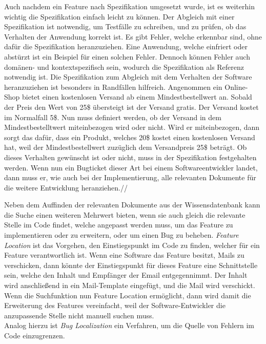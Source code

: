 Auch nachdem ein Feature nach Spezifikation umgesetzt wurde, ist es weiterhin wichtig die Spezifikation einfach leicht zu können.
Der Abgleich mit einer Spezifikation ist notwendig, um Testfälle zu schreiben, und zu prüfen, ob das Verhalten der Anwendung korrekt ist.
Es gibt Fehler, welche erkennbar sind, ohne dafür die Spezifikation heranzuziehen.
Eine Anwendung, welche einfriert oder abstürzt ist ein Beispiel für einen solchen Fehler.
Dennoch können Fehler auch domänen- und kontextspezifisch sein, wodurch die Spezifikation als Referenz notwendig ist.
Die Spezifikation zum Abgleich mit dem Verhalten der Software heranzuziehen ist besonders in Randfällen hilfreich.
Angenommen ein Online-Shop bietet einen kostenlosen Versand ab einem Mindestbestellwert an.
Sobald der Preis den Wert von 25\$ übersteigt ist der Versand gratis.
Der Versand kostet im Normalfall 5\$.
Nun muss definiert werden, ob der Versand in dem Mindestbestelltwert miteinbezogen wird oder nicht.
Wird er miteinbezogen, dann sorgt das dafür, dass ein Produkt, welches 20\$ kostet einen kostenlosen Versand hat, weil der Mindestbestellwert zuzüglich dem Versandpreis 25\$ beträgt.
Ob dieses Verhalten gewünscht ist oder nicht, muss in der Spezifikation festgehalten werden.
Wenn nun ein Bugticket dieser Art bei einem Softwareentwickler landet, dann muss er, wie auch bei der Implementierung, alle relevanten Dokumente für die weitere Entwicklung heranziehen.//

Neben dem Auffinden der relevanten Dokumente aus der Wissensdatenbank kann die Suche einen weiteren Mehrwert bieten, wenn sie auch gleich die relevante Stelle im Code findet, welche angepasst werden muss, um das Feature zu implementieren oder zu erweitern, oder um einen Bug zu beheben.
\textit{Feature Location} ist das Vorgehen, den Einstiegspunkt im Code zu finden, welcher für ein Feature verantwortlich ist.
Wenn eine Software das Feature besitzt, Mails zu verschicken, dann könnte der Einstiegspunkt für dieses Feature eine Schnittstelle sein, welche den Inhalt und Empfänger der Email entgegennimmt.
Der Inhalt wird anschließend in ein Mail-Template eingefügt, und die Mail wird verschickt.
Wenn die Suchfunktion nun Feature Location ermöglicht, dann wird damit die Erweiterung des Features vereinfacht, weil der Software-Entwickler die anzupassende Stelle nicht manuell suchen muss.\\

Analog hierzu ist \textit{Bug Localization} ein Verfahren, um die Quelle von Fehlern im Code einzugrenzen.

